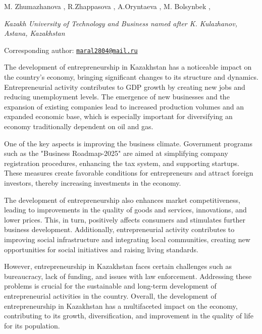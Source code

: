 
\begin{articleheader}

M. Zhumazhanova \authorid,
R.Zhappasova \authorid,
A.Oryntaeva \authorid,
M. Bolsynbek \authorid,
\end{articleheader}

\begin{affiliation}
\emph{Kazakh University of Technology and Business named after K.
Kulazhanov, Astana, Kazakhstan}

\raggedright \textsuperscript{\envelope }Corresponding author: \href{mailto:maral2804@mail.ru}{\nolinkurl{maral2804@mail.ru}}
\end{affiliation}

The development of entrepreneurship in Kazakhstan has a noticeable
impact on the country's economy, bringing significant changes to its
structure and dynamics. Entrepreneurial activity contributes to GDP
growth by creating new jobs and reducing unemployment levels. The
emergence of new businesses and the expansion of existing companies lead
to increased production volumes and an expanded economic base, which is
especially important for diversifying an economy traditionally dependent
on oil and gas.

One of the key aspects is improving the business climate. Government
programs such as the "Business Roadmap-2025" are aimed at simplifying
company registration procedures, enhancing the tax system, and
supporting startups. These measures create favorable conditions for
entrepreneurs and attract foreign investors, thereby increasing
investments in the economy.

The development of entrepreneurship also enhances market
competitiveness, leading to improvements in the quality of goods and
services, innovations, and lower prices. This, in turn, positively
affects consumers and stimulates further business development.
Additionally, entrepreneurial activity contributes to improving social
infrastructure and integrating local communities, creating new
opportunities for social initiatives and raising living standards.

However, entrepreneurship in Kazakhstan faces certain challenges such as
bureaucracy, lack of funding, and issues with law enforcement.
Addressing these problems is crucial for the sustainable and long-term
development of entrepreneurial activities in the country. Overall, the
development of entrepreneurship in Kazakhstan has a multifaceted impact
on the economy, contributing to its growth, diversification, and
improvement in the quality of life for its population.

